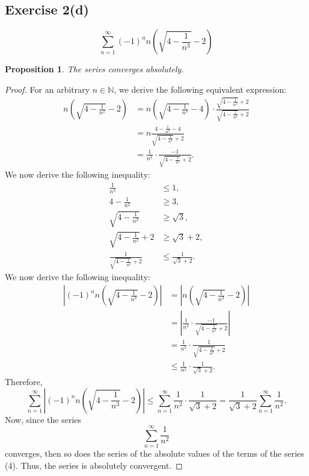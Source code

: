 \documentclass[12pt]{article}
\newtheorem{proposition}{Proposition}
\newenvironment{problem}
    {\begin{lrbox}{\mybox}\begin{minipage}{0.98\textwidth}}
    {\end{minipage}\end{lrbox}\framebox[\textwidth]{\usebox{\mybox}}}
\newcommand{\N}{\mathbb{N}} %
\newcommand{\<}{\left\langle} %
\renewcommand{\>}{\right\rangle} %
\begin{document}
\newpage
\subsection*{Exercise 2(d)}
\begin{problem}
    \begin{equation}
        \sum_{n=1}^\infty (-1)^n n\left (\sqrt{4 - \frac{1}{n^3}} -2 \right)
    \end{equation}
\end{problem}

\begin{proposition}
    The series converges absolutely.
\end{proposition}

\begin{proof}
    For an arbitrary $n \in \N$, we derive the following equivalent expression:
    \begin{align*}
        n \left( \sqrt{4 - \frac{1}{n^2}} - 2 \right)
            &= n \left( \sqrt{4 - \frac{1}{n^3}} - 4 \right) \cdot \frac{\sqrt{4 - \frac{1}{n^3}} + 2}{\sqrt{4 - \frac{1}{n^3}} + 2} \\
            &= n \frac{4 - \frac{1}{n^3} - 4}{\sqrt{4 - \frac{1}{n^3}} + 2} \\
            &= \frac{1}{n^2} \cdot \frac{-1}{\sqrt{4 - \frac{1}{n^3}} + 2}.
    \end{align*}
    We now derive the following inequality:
    \begin{align*}
        \frac{1}{n^3} &\leq 1, \\[1em]
        4 - \frac{1}{n^2} &\geq 3, \\[1em]
        \sqrt{4 - \frac{1}{n^2}} &\geq \sqrt{3}, \\[1em]
        \sqrt{4 - \frac{1}{n^2}} + 2 &\geq \sqrt{3} + 2, \\[1em]
        \frac{1}{\sqrt{4 - \frac{1}{n^2}} + 2} &\leq \frac{1}{\sqrt{3} + 2}.
    \end{align*}
    We now derive the following inequality:
    \begin{align*}
        \left| (-1)^n n\left (\sqrt{4 - \frac{1}{n^3}} -2 \right) \right|
            &= \left| n\left (\sqrt{4 - \frac{1}{n^3}} -2 \right) \right| \\
            &= \left| \frac{1}{n^2} \cdot \frac{-1}{\sqrt{4 - \frac{1}{n^3}} + 2} \right| \\
            &= \frac{1}{n^2} \cdot \frac{1}{\sqrt{4 - \frac{1}{n^3}} + 2} \\
            &\leq \frac{1}{n^2} \cdot \frac{1}{\sqrt{3} + 2}.
    \end{align*}
    Therefore,
    \[\sum_{n=1}^\infty \left| (-1)^n n\left (\sqrt{4 - \frac{1}{n^3}} -2 \right) \right| \leq \sum_{n=1}^\infty \frac{1}{n^2} \cdot \frac{1}{\sqrt{3} + 2} = \frac{1}{\sqrt{3} + 2} \sum_{n=1}^\infty \frac{1}{n^2}.\]
    Now, since the series
    \[\sum_{n=1}^\infty \frac{1}{n^2}\]
    converges, then so does the series of the absolute values of the terms of the series (4). Thus, the series is absolutely convergent.
    
\end{proof}
\end{document}
